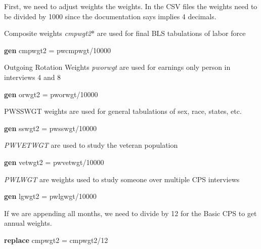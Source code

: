 \documentclass[
]{book}
\newenvironment{Shaded}{\begin{snugshade}}{\end{snugshade}}
\newcommand{\KeywordTok}[1]{\textcolor[rgb]{0.13,0.29,0.53}{\textbf{#1}}}
\newcommand{\NormalTok}[1]{#1}
\begin{document}
First, we need to adjust weights the weights. In the CSV files the weights need to be divided by 1000 since the documentation says implies 4 decimals.

Composite weights \emph{cmpwgt2}* are used for final BLS tabulations of labor force

\begin{Shaded}
\begin{Highlighting}[]

\KeywordTok{gen}\NormalTok{ cmpwgt2 = pwcmpwgt/10000}
\end{Highlighting}
\end{Shaded}

Outgoing Rotation Weights \emph{pworwgt} are used for earnings only person in interviews 4 and 8

\begin{Shaded}
\begin{Highlighting}[]
\KeywordTok{gen}\NormalTok{ orwgt2 = pworwgt/10000}
\end{Highlighting}
\end{Shaded}

PWSSWGT weights are used for general tabulations of sex, race, states, etc.

\begin{Shaded}
\begin{Highlighting}[]
\KeywordTok{gen}\NormalTok{ sswgt2 = pwsswgt/10000}
\end{Highlighting}
\end{Shaded}

\emph{PWVETWGT} are used to study the veteran population

\begin{Shaded}
\begin{Highlighting}[]
\KeywordTok{gen}\NormalTok{ vetwgt2 = pwvetwgt/10000}
\end{Highlighting}
\end{Shaded}

\emph{PWLWGT} are weights used to study someone over multiple CPS interviews

\begin{Shaded}
\begin{Highlighting}[]
\KeywordTok{gen}\NormalTok{ lgwgt2 = pwlgwgt/10000}
\end{Highlighting}
\end{Shaded}

If we are appending all months, we need to divide by 12 for the Basic CPS to get annual weights.

\begin{Shaded}
\begin{Highlighting}[]
    \KeywordTok{replace}\NormalTok{ cmpwgt2 = cmpwgt2/12}
\end{Highlighting}
\end{Shaded}
\end{document}
